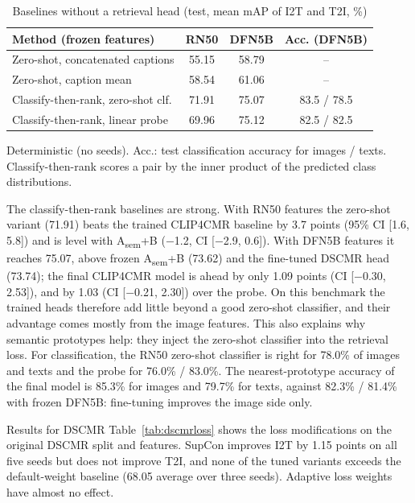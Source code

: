 \documentclass[conference]{IEEEtran}
\makeatletter
\newcommand{\Asem}{A\textsubscript{sem}}
\def\subsection{\@startsection{subsection}{2}{\z@}{1.6ex plus .8ex minus .4ex}{.7ex plus .2ex}%
  {\normalfont\fontsize{11}{13}\selectfont\bfseries\itshape\raggedright}}
\makeatother
\begin{document}
\begin{table}[t]
\centering
\caption{Baselines without a retrieval head (test, mean mAP of I2T and T2I, \%)}
\label{tab:baselines}
\small
\setlength{\tabcolsep}{4pt}
\begin{tabular*}{\columnwidth}{@{\extracolsep{\fill}}lccc@{}}
\toprule
Method (frozen features) & RN50 & DFN5B & Acc. (DFN5B) \\
\midrule
Zero-shot, concatenated captions & 55.15 & 58.79 & -- \\
Zero-shot, caption mean & 58.54 & 61.06 & -- \\
Classify-then-rank, zero-shot clf. & 71.91 & 75.07 & 83.5 / 78.5 \\
Classify-then-rank, linear probe & 69.96 & 75.12 & 82.5 / 82.5 \\
\bottomrule
\end{tabular*}

\vspace{2pt}
\parbox{\columnwidth}{\footnotesize Deterministic (no seeds). Acc.: test classification accuracy for images / texts. Classify-then-rank scores a pair by the inner product of the predicted class distributions.}
\end{table}

The classify-then-rank baselines are strong. With RN50 features the zero-shot variant (71.91) beats the trained CLIP4CMR baseline by 3.7 points (95\% CI [1.6, 5.8]) and is level with \Asem+B ($-$1.2, CI [$-$2.9, 0.6]). With DFN5B features it reaches 75.07, above frozen \Asem+B (73.62) and the fine-tuned DSCMR head (73.74); the final CLIP4CMR model is ahead by only 1.09 points (CI [$-$0.30, 2.53]), and by 1.03 (CI [$-$0.21, 2.30]) over the probe. On this benchmark the trained heads therefore add little beyond a good zero-shot classifier, and their advantage comes mostly from the image features. This also explains why semantic prototypes help: they inject the zero-shot classifier into the retrieval loss. For classification, the RN50 zero-shot classifier is right for 78.0\% of images and texts and the probe for 76.0\% / 83.0\%. The nearest-prototype accuracy of the final model is 85.3\% for images and 79.7\% for texts, against 82.3\% / 81.4\% with frozen DFN5B: fine-tuning improves the image side only.

\subsection{Results for DSCMR}
Table~\ref{tab:dscmrloss} shows the loss modifications on the original DSCMR split and features. SupCon improves I2T by 1.15 points on all five seeds but does not improve T2I, and none of the tuned variants exceeds the default-weight baseline (68.05 average over three seeds). Adaptive loss weights have almost no effect.
\end{document}
